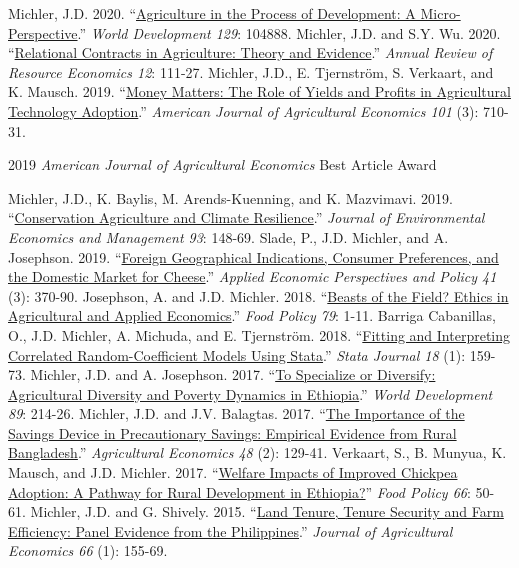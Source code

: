 \documentclass[letterpaper]{article}
\renewenvironment{itemize}{
  \begin{list}
  	{}{
    \setlength{\leftmargin}{1.5em}
    \setlength{\itemsep}{-.5em}
  }
}{
  \end{list}
}
\begin{document}
\begin{itemize}
\subitem[11] Michler, J.D. 2020. ``\href{https://doi.org/10.1016/j.worlddev.2020.104888}{Agriculture in the Process of Development: A Micro-Perspective}.'' \emph{World Development 129}: 104888.
\subitem[10] Michler, J.D. and S.Y. Wu. 2020. ``\href{https://doi.org/10.1146/annurev-resource-101719-034514}{Relational Contracts in Agriculture: Theory and Evidence}.'' \emph{Annual Review of Resource Economics 12}: 111-27.
\subitem[9] Michler, J.D., E. Tjernstr\"{o}m, S. Verkaart, and K. Mausch. 2019. ``\href{https://doi.org/10.1093/ajae/aay050}{Money Matters: The Role of Yields and Profits in Agricultural Technology Adoption}.'' \emph{American Journal of Agricultural Economics 101} (3): 710-31.
\begin{itemize}
        \leftskip 0.25in
	\parindent -0.5in
	\item[\textbullet] 2019 \emph{American Journal of Agricultural Economics} Best Article Award
\end{itemize}
\subitem[8] Michler, J.D., K. Baylis, M. Arends-Kuenning, and K. Mazvimavi. 2019. ``\href{https://doi.org/10.1016/j.jeem.2018.11.008}{Conservation Agriculture and Climate Resilience}.'' \emph{Journal of Environmental Economics and Management 93}: 148-69. 
\subitem[7] Slade, P., J.D. Michler, and A. Josephson. 2019. ``\href{https://doi.org/10.1093/aepp/ppz010}{Foreign Geographical Indications, Consumer Preferences, and the Domestic Market for Cheese}.'' \emph{Applied Economic Perspectives and Policy 41} (3): 370-90. 
\subitem[6] Josephson, A. and J.D. Michler. 2018. ``\href{https://doi.org/10.1016/j.foodpol.2018.08.001}{Beasts of the Field? Ethics in Agricultural and Applied Economics}.'' \emph{Food Policy 79}: 1-11.
\subitem[5] Barriga Cabanillas, O., J.D. Michler, A. Michuda, and E. Tjernstr\"{o}m. 2018. ``\href{http://www.stata-journal.com/article.html?article=st0517}{Fitting and Interpreting Correlated Random-Coefficient Models Using Stata}.'' \emph{Stata Journal 18} (1): 159-73.
\subitem[4] Michler, J.D. and A. Josephson. 2017.  ``\href{https://doi.org/10.1016/j.worlddev.2016.08.011}{To Specialize or Diversify: Agricultural Diversity and Poverty Dynamics in Ethiopia}.'' \emph{World Development 89}: 214-26.
\subitem[3] Michler, J.D. and J.V. Balagtas. 2017. ``\href{https://doi.org/10.1111/agec.12320}{The Importance of the Savings Device in Precautionary Savings: Empirical Evidence from Rural Bangladesh}.'' \emph{Agricultural Economics 48} (2): 129-41.
\subitem[2] Verkaart, S., B. Munyua, K. Mausch, and J.D. Michler. 2017. ``\href{https://doi.org/10.1016/j.foodpol.2016.11.007}{Welfare Impacts of Improved Chickpea Adoption: A Pathway for Rural Development in Ethiopia?}''  \emph{Food Policy 66}: 50-61.
\subitem[1] Michler, J.D. and G. Shively. 2015. ``\href{https://doi.org/10.1111/1477-9552.12082}{Land Tenure, Tenure Security and Farm Efficiency: Panel Evidence from the Philippines}.'' \emph{Journal of Agricultural Economics 66} (1): 155-69. \\



\end{itemize}
\end{document}
